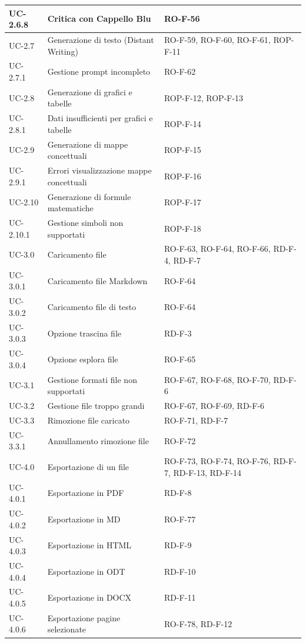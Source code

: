 \documentclass[11pt,a4paper]{article}
\begin{document}
\begin{longtable}{|p{}|p{}|>{\raggedright\arraybackslash}p{}|}
\hline
UC-2.6.8 & Critica con Cappello Blu & RO-F-56 \\
\hline
UC-2.7 & Generazione di testo (Distant Writing) & RO-F-59, RO-F-60, RO-F-61, ROP-F-11 \\
\hline
UC-2.7.1 & Gestione prompt incompleto & RO-F-62 \\
\hline
UC-2.8 & Generazione di grafici e tabelle & ROP-F-12, ROP-F-13 \\
\hline
UC-2.8.1 & Dati insufficienti per grafici e tabelle & ROP-F-14 \\
\hline
UC-2.9 & Generazione di mappe concettuali & ROP-F-15 \\
\hline
UC-2.9.1 & Errori visualizzazione mappe concettuali & ROP-F-16 \\
\hline
UC-2.10 & Generazione di formule matematiche & ROP-F-17 \\
\hline
UC-2.10.1 & Gestione simboli non supportati & ROP-F-18 \\
\hline
UC-3.0 & Caricamento file & RO-F-63, RO-F-64, RO-F-66, RD-F-4, RD-F-7 \\
\hline
UC-3.0.1 & Caricamento file Markdown & RO-F-64 \\
\hline
UC-3.0.2 & Caricamento file di testo & RO-F-64 \\
\hline
UC-3.0.3 & Opzione trascina file & RD-F-3 \\
\hline
UC-3.0.4 & Opzione esplora file & RO-F-65 \\
\hline
UC-3.1 & Gestione formati file non supportati & RO-F-67, RO-F-68, RO-F-70, RD-F-6 \\
\hline
UC-3.2 & Gestione file troppo grandi & RO-F-67, RO-F-69, RD-F-6 \\
\hline
UC-3.3 & Rimozione file caricato & RO-F-71, RD-F-7 \\
\hline
UC-3.3.1 & Annullamento rimozione file & RO-F-72 \\
\hline
UC-4.0 & Esportazione di un file & RO-F-73, RO-F-74, RO-F-76, RD-F-7, RD-F-13, RD-F-14 \\
\hline
UC-4.0.1 & Esportazione in PDF & RD-F-8 \\
\hline
UC-4.0.2 & Esportazione in MD & RO-F-77 \\
\hline
UC-4.0.3 & Esportazione in HTML & RD-F-9 \\
\hline
UC-4.0.4 & Esportazione in ODT & RD-F-10 \\
\hline
UC-4.0.5 & Esportazione in DOCX & RD-F-11 \\
\hline
UC-4.0.6 & Esportazione pagine selezionate & RO-F-78, RD-F-12 \\

\end{longtable}
\end{document}
